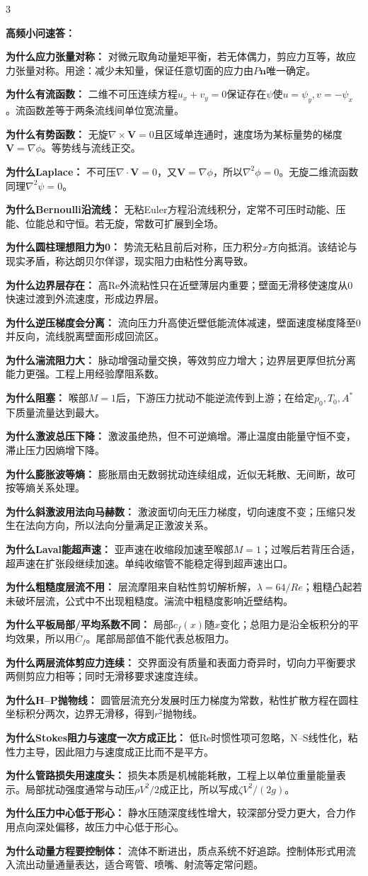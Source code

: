 \documentclass[a4paper]{article}
\newcommand{\sect}[1]{\par{\bfseries\color{Q}#1：}}
\begin{document}
\begin{multicols}{3}
{\sect{高频小问速答}
\sect{为什么应力张量对称}
对微元取角动量矩平衡，若无体偶力，剪应力互等，故应力张量对称。用途：减少未知量，保证任意切面的应力由$P\bm n$唯一确定。
\sect{为什么有流函数}
二维不可压连续方程$u_x+v_y=0$保证存在$\psi$使$u=\psi_y,v=-\psi_x$。流函数差等于两条流线间单位宽流量。
\sect{为什么有势函数}
无旋$\nabla\times\bm V=0$且区域单连通时，速度场为某标量势的梯度$\bm V=\nabla\phi$。等势线与流线正交。
\sect{为什么Laplace}
不可压$\nabla\cdot\bm V=0$，又$\bm V=\nabla\phi$，所以$\nabla^2\phi=0$。无旋二维流函数同理$\nabla^2\psi=0$。
\sect{为什么Bernoulli沿流线}
无粘Euler方程沿流线积分，定常不可压时动能、压能、位能总和守恒。若无旋，常数可扩展到全场。
\sect{为什么圆柱理想阻力为0}
势流无粘且前后对称，压力积分$x$方向抵消。该结论与现实矛盾，称达朗贝尔佯谬，现实阻力由粘性分离导致。
\sect{为什么边界层存在}
高Re外流粘性只在近壁薄层内重要；壁面无滑移使速度从0快速过渡到外流速度，形成边界层。
\sect{为什么逆压梯度会分离}
流向压力升高使近壁低能流体减速，壁面速度梯度降至0并反向，流线脱离壁面形成回流区。
\sect{为什么湍流阻力大}
脉动增强动量交换，等效剪应力增大；边界层更厚但抗分离能力更强。工程上用经验摩阻系数。
\sect{为什么阻塞}
喉部$M=1$后，下游压力扰动不能逆流传到上游；在给定$p_0,T_0,A^*$下质量流量达到最大。
\sect{为什么激波总压下降}
激波虽绝热，但不可逆熵增。滞止温度由能量守恒不变，滞止压力因熵增下降。
\sect{为什么膨胀波等熵}
膨胀扇由无数弱扰动连续组成，近似无耗散、无间断，故可按等熵关系处理。
\sect{为什么斜激波用法向马赫数}
激波面切向无压力梯度，切向速度不变；压缩只发生在法向方向，所以法向分量满足正激波关系。
\sect{为什么Laval能超声速}
亚声速在收缩段加速至喉部$M=1$；过喉后若背压合适，超声速在扩张段继续加速。单纯收缩管不能稳定得到超声速出口。
\sect{为什么粗糙度层流不用}
层流摩阻来自粘性剪切解析解，$\lambda=64/Re$；粗糙凸起若未破坏层流，公式中不出现粗糙度。湍流中粗糙度影响近壁结构。
\sect{为什么平板局部/平均系数不同}
局部$c_f(x)$随$x$变化；总阻力是沿全板积分的平均效果，所以用$\bar C_f$。尾部局部值不能代表总板阻力。
\sect{为什么两层流体剪应力连续}
交界面没有质量和表面力奇异时，切向力平衡要求两侧剪应力相等；同时无滑移要求速度连续。
\sect{为什么H--P抛物线}
圆管层流充分发展时压力梯度为常数，粘性扩散方程在圆柱坐标积分两次，边界无滑移，得到$r^2$抛物线。
\sect{为什么Stokes阻力与速度一次方成正比}
低Re时惯性项可忽略，N--S线性化，粘性力主导，因此阻力与速度成正比而不是平方。
\sect{为什么管路损失用速度头}
损失本质是机械能耗散，工程上以单位重量能量表示。局部扰动强度通常与动压$\rho V^2/2$成正比，所以写成$\zeta V^2/(2g)$。
\sect{为什么压力中心低于形心}
静水压随深度线性增大，较深部分受力更大，合力作用点向深处偏移，故压力中心低于形心。
\sect{为什么动量方程要控制体}
流体不断进出，质点系统不好追踪。控制体形式用流入流出动量通量表达，适合弯管、喷嘴、射流等定常问题。
}
\end{multicols}
\end{document}
